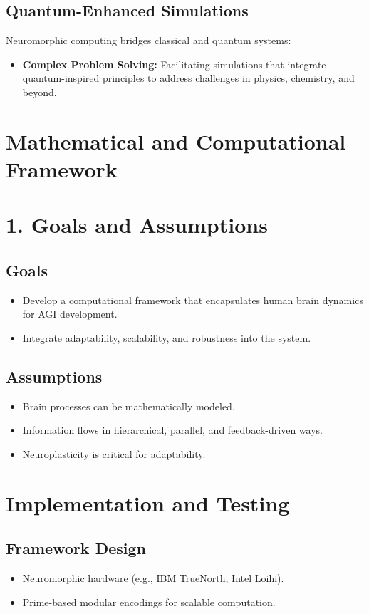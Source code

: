 \documentclass{article}
\theoremstyle{plain}
\begin{document}
\subsection{Quantum-Enhanced Simulations}
Neuromorphic computing bridges classical and quantum systems:
\begin{itemize}
    \item \textbf{Complex Problem Solving:} Facilitating simulations that integrate quantum-inspired principles to address challenges in physics, chemistry, and beyond.
\end{itemize}


\section{Mathematical and Computational Framework}

\section*{1. Goals and Assumptions}

\subsection*{Goals}
\begin{itemize}
    \item Develop a computational framework that encapsulates human brain dynamics for AGI development.
    \item Integrate adaptability, scalability, and robustness into the system.
\end{itemize}

\subsection*{Assumptions}
\begin{itemize}
    \item Brain processes can be mathematically modeled.
    \item Information flows in hierarchical, parallel, and feedback-driven ways.
    \item Neuroplasticity is critical for adaptability.
\end{itemize}


\section{Implementation and Testing}

\subsection{Framework Design}
\begin{itemize}
    \item Neuromorphic hardware (e.g., IBM TrueNorth, Intel Loihi).
    \item Prime-based modular encodings for scalable computation.
\end{itemize}
\end{document}
